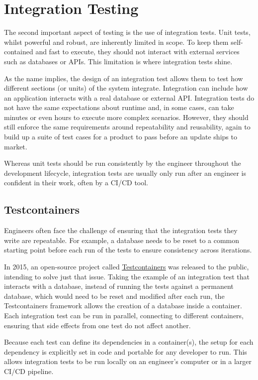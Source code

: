 \section{Integration Testing}
The second important aspect of testing is the use of integration tests. Unit tests, whilst powerful and robust, are inherently limited in scope.
To keep them self-contained and fast to execute, they should not interact with external services such as databases or APIs. This limitation is where integration tests shine.

As the name implies, the design of an integration test allows them to test how different sections (or units) of the system integrate.
Integration can include how an application interacts with a real database or external API.
Integration tests do not have the same expectations about runtime and, in some cases, can take minutes or even hours to execute more complex scenarios.
However, they should still enforce the same requirements around repeatability and reusability, again to build up a suite of test cases for a product to pass before an update ships to market. 

Whereas unit tests should be run consistently by the engineer throughout the development lifecycle, integration tests are usually only run after an engineer is confident in their work, often by a CI/CD tool.

\subsection{Testcontainers}
Engineers often face the challenge of ensuring that the integration tests they write are repeatable.
For example, a database needs to be reset to a common starting point before each run of the tests to ensure consistency across iterations. 

In 2015, an open-source project called \underline{\href{https://testcontainers.com}{Testcontainers}} \nocite{testcontainers} was released to the public, intending to solve just that issue.
Taking the example of an integration test that interacts with a database, instead of running the tests against a permanent database, which would need to be reset and modified after each run, the Testcontainers framework allows the creation of a database inside a container.
Each integration test can be run in parallel, connecting to different containers, ensuring that side effects from one test do not affect another. 

Because each test can define its dependencies in a container(s), the setup for each dependency is explicitly set in code and portable for any developer to run.
This allows integration tests to be run locally on an engineer's computer or in a larger CI/CD pipeline. 

